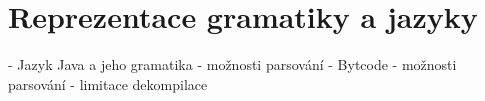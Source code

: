 \chapter{Reprezentace gramatiky a jazyky}
 - Jazyk Java a jeho gramatika
  - možnosti parsování
 - Bytcode
  - možnosti parsování
  - limitace dekompilace